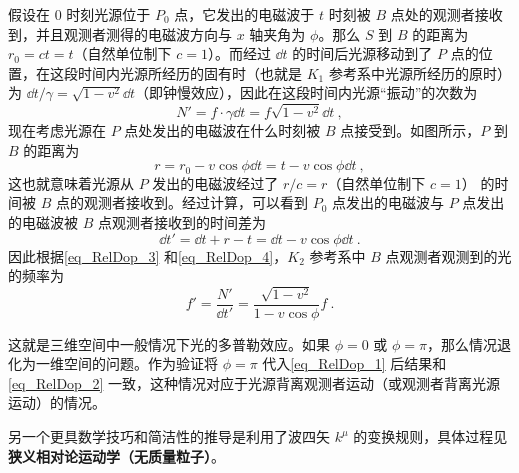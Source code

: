 假设在 $0$ 时刻光源位于 $P_0$ 点，它发出的电磁波于 $t$ 时刻被 $B$ 点处的观测者接收到，并且观测者测得的电磁波方向与 $x$ 轴夹角为 $\phi$。那么 $S$ 到 $B$ 的距离为 $r_0=ct=t$（自然单位制下 $c=1$）。而经过 $\dd t$ 的时间后光源移动到了 $P$ 点的位置，在这段时间内光源所经历的固有时（也就是 $K_1$ 参考系中光源所经历的原时）为 $\dd t/\gamma=\sqrt{1-v^2}\dd t$（即钟慢效应），因此在这段时间内光源“振动”的次数为
\begin{equation}\label{eq_RelDop_3}
N'=f\cdot \gamma \dd t = f\sqrt{1-v^2}\dd t~,
\end{equation}
现在考虑光源在 $P$ 点处发出的电磁波在什么时刻被 $B$ 点接受到。如图所示，$P$ 到 $B$ 的距离为
\begin{equation}
r=r_0-v\cos\phi \dd t=t-v\cos\phi\dd t~,
\end{equation}
这也就意味着光源从 $P$ 发出的电磁波经过了 $r/c=r$（自然单位制下 $c=1$） 的时间被 $B$ 点的观测者接收到。经过计算，可以看到 $P_0$ 点发出的电磁波与 $P$ 点发出的电磁波被 $B$ 点观测者接收到的时间差为
\begin{equation}\label{eq_RelDop_4}
\dd t' = \dd t + r - t = \dd t -v\cos\phi\dd t~.
\end{equation}
因此根据\autoref{eq_RelDop_3} 和\autoref{eq_RelDop_4}，$K_2$ 参考系中 $B$ 点观测者观测到的光的频率为
\begin{equation}\label{eq_RelDop_1}
f'=\frac{N'}{\dd t'}=\frac{\sqrt{1-v^2}}{1-v\cos\phi} f~.
\end{equation}

这就是三维空间中一般情况下光的多普勒效应。如果 $\phi=0$ 或 $\phi=\pi$，那么情况退化为一维空间的问题。作为验证将 $\phi=\pi$ 代入\autoref{eq_RelDop_1} 后结果和\autoref{eq_RelDop_2} 一致，这种情况对应于光源背离观测者运动（或观测者背离光源运动）的情况。

另一个更具数学技巧和简洁性的推导是利用了波四矢 $k^\mu$ 的变换规则，具体过程见\textbf{狭义相对论运动学（无质量粒子）}。
